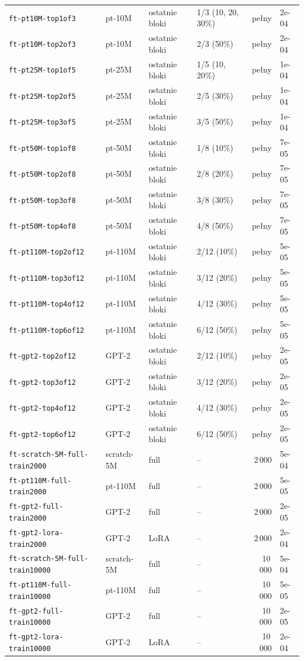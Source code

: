 {\begin{longtable}{@{}llllrl@{}}
\texttt{ft-pt10M-top1of3} & pt-10M & ostatnie bloki & 1/3 (10, 20, 30\%) & pełny & 2e-04 \\
\texttt{ft-pt10M-top2of3} & pt-10M & ostatnie bloki & 2/3 (50\%) & pełny & 2e-04 \\
\texttt{ft-pt25M-top1of5} & pt-25M & ostatnie bloki & 1/5 (10, 20\%) & pełny & 1e-04 \\
\texttt{ft-pt25M-top2of5} & pt-25M & ostatnie bloki & 2/5 (30\%) & pełny & 1e-04 \\
\texttt{ft-pt25M-top3of5} & pt-25M & ostatnie bloki & 3/5 (50\%) & pełny & 1e-04 \\
\texttt{ft-pt50M-top1of8} & pt-50M & ostatnie bloki & 1/8 (10\%) & pełny & 7e-05 \\
\texttt{ft-pt50M-top2of8} & pt-50M & ostatnie bloki & 2/8 (20\%) & pełny & 7e-05 \\
\texttt{ft-pt50M-top3of8} & pt-50M & ostatnie bloki & 3/8 (30\%) & pełny & 7e-05 \\
\texttt{ft-pt50M-top4of8} & pt-50M & ostatnie bloki & 4/8 (50\%) & pełny & 7e-05 \\
\texttt{ft-pt110M-top2of12} & pt-110M & ostatnie bloki & 2/12 (10\%) & pełny & 5e-05 \\
\texttt{ft-pt110M-top3of12} & pt-110M & ostatnie bloki & 3/12 (20\%) & pełny & 5e-05 \\
\texttt{ft-pt110M-top4of12} & pt-110M & ostatnie bloki & 4/12 (30\%) & pełny & 5e-05 \\
\texttt{ft-pt110M-top6of12} & pt-110M & ostatnie bloki & 6/12 (50\%) & pełny & 5e-05 \\
\texttt{ft-gpt2-top2of12} & GPT-2 & ostatnie bloki & 2/12 (10\%) & pełny & 2e-05 \\
\texttt{ft-gpt2-top3of12} & GPT-2 & ostatnie bloki & 3/12 (20\%) & pełny & 2e-05 \\
\texttt{ft-gpt2-top4of12} & GPT-2 & ostatnie bloki & 4/12 (30\%) & pełny & 2e-05 \\
\texttt{ft-gpt2-top6of12} & GPT-2 & ostatnie bloki & 6/12 (50\%) & pełny & 2e-05 \\
\texttt{ft-scratch-5M-full-train2000} & scratch-5M & full & -- & 2\,000 & 5e-04 \\
\texttt{ft-pt110M-full-train2000} & pt-110M & full & -- & 2\,000 & 5e-05 \\
\texttt{ft-gpt2-full-train2000} & GPT-2 & full & -- & 2\,000 & 2e-05 \\
\texttt{ft-gpt2-lora-train2000} & GPT-2 & LoRA & -- & 2\,000 & 2e-04 \\
\texttt{ft-scratch-5M-full-train10000} & scratch-5M & full & -- & 10\,000 & 5e-04 \\
\texttt{ft-pt110M-full-train10000} & pt-110M & full & -- & 10\,000 & 5e-05 \\
\texttt{ft-gpt2-full-train10000} & GPT-2 & full & -- & 10\,000 & 2e-05 \\
\texttt{ft-gpt2-lora-train10000} & GPT-2 & LoRA & -- & 10\,000 & 2e-04 \\
\end{longtable}
}
